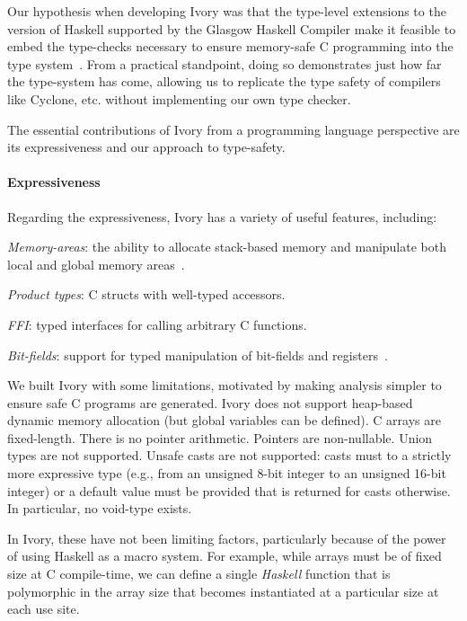 Our hypothesis when developing Ivory was that the type-level extensions to the
version of Haskell supported by the Glasgow Haskell Compiler make it feasible to
embed the type-checks necessary to ensure memory-safe C programming into the
type system~\cite{dephaskell}.  From a practical standpoint, doing so
demonstrates just how far the type-system has come, allowing us to replicate the
type safety of compilers like Cyclone, etc. without implementing our own type
checker.

The essential contributions of Ivory from a programming language perspective are
its expressiveness and our approach to type-safety.

\paragraph{Expressiveness}
Regarding the expressiveness, Ivory has a variety of useful features, including:
\begin{compactitem}
  \item \emph{Memory-areas}: the ability to allocate stack-based memory and
    manipulate both local and global memory areas~\cite{memareas}.
  \item \emph{Product types}: C structs with well-typed accessors.
  \item \emph{FFI}: typed interfaces for calling arbitrary C functions.
  \item \emph{Bit-fields}: support for typed manipulation of bit-fields and
    registers~\cite{high-level}.
\end{compactitem}

We built Ivory with some limitations, motivated by making analysis simpler to
ensure safe C programs are generated.  Ivory does not support heap-based dynamic
memory allocation (but global variables can be defined).  C arrays are
fixed-length.  There is no pointer arithmetic.  Pointers are non-nullable.
Union types are not supported.  Unsafe casts are not supported: casts must to a
strictly more expressive type (e.g., from an unsigned 8-bit integer to an
unsigned 16-bit integer) or a default value must be provided that is returned
for casts otherwise.  In particular, no void-type exists.

In Ivory, these have not been limiting factors, particularly because of the
power of using Haskell as a macro system.  For example, while arrays must be of
fixed size at C compile-time, we can define a single \emph{Haskell} function
that is polymorphic in the array size that becomes instantiated at a particular
size at each use site.  %

